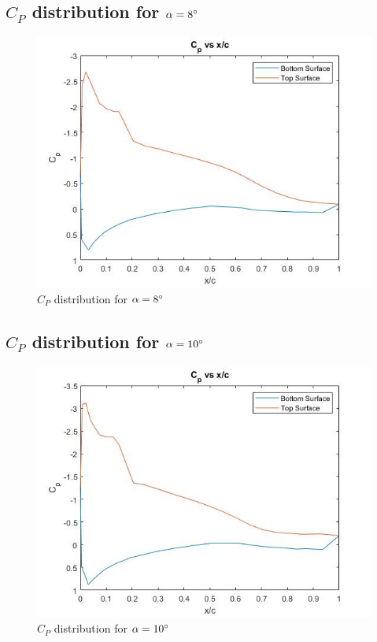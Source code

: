 \documentclass[12pt]{article}
\begin{document}
        \newpage
    \subsection{\(C_P\) distribution for \(\alpha = 8\degree\)}
    \begin{figure}[h]
        \includegraphics[width=16 cm]{8.jpg}
        \centering
        \caption{\(C_P\) distribution for \(\alpha = 8\degree\)}
    \end{figure}

    \newpage
    \subsection{\(C_P\) distribution for \(\alpha = 10\degree\)}
    \begin{figure}[h]
        \includegraphics[width=16 cm]{10.jpg}
        \centering
        \caption{\(C_P\) distribution for \(\alpha = 10\degree\)}
    \end{figure}
    
\end{document}
